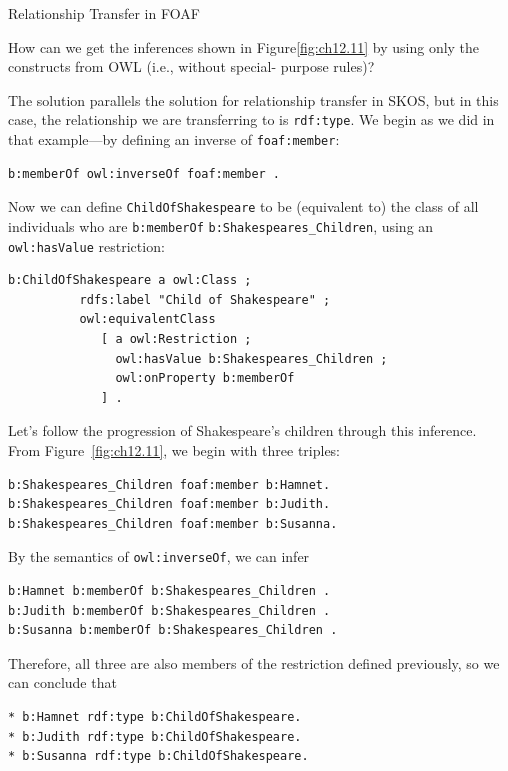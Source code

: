 \begin{challenge} {Relationship Transfer in FOAF}
\label{chal:26}

How can we get the inferences shown in Figure\ref{fig:ch12.11} by using only the
constructs from OWL (i.e., without special- purpose rules)?

\solution

The solution parallels the solution for relationship transfer in SKOS,
but in this case, the relationship we are transferring to is \texttt{rdf:type}.
We begin as we did in that example---by defining an inverse of
\texttt{foaf:member}:

\begin{lstlisting}
b:memberOf owl:inverseOf foaf:member .
\end{lstlisting}

Now we can define \texttt{ChildOfShakespeare} to be (equivalent to) the class of
all individuals who are
\texttt{b:memberOf} \texttt{b:Shakespeares\_Children}, using an \texttt{owl:hasValue} restriction:

\begin{lstlisting}
b:ChildOfShakespeare a owl:Class ;
          rdfs:label "Child of Shakespeare" ;
          owl:equivalentClass
             [ a owl:Restriction ;
               owl:hasValue b:Shakespeares_Children ;
               owl:onProperty b:memberOf
             ] .
\end{lstlisting}

Let's follow the progression of Shakespeare's children through this
inference. From Figure~\ref{fig:ch12.11}, we begin with three triples:

\begin{lstlisting}
b:Shakespeares_Children foaf:member b:Hamnet.
b:Shakespeares_Children foaf:member b:Judith.
b:Shakespeares_Children foaf:member b:Susanna.
\end{lstlisting}

By the semantics of \texttt{owl:inverseOf}, we can infer

\begin{lstlisting}
b:Hamnet b:memberOf b:Shakespeares_Children .
b:Judith b:memberOf b:Shakespeares_Children .
b:Susanna b:memberOf b:Shakespeares_Children .
\end{lstlisting}

Therefore, all three are also members of the restriction defined
previously, so we can conclude that

\begin{lstlisting}
* b:Hamnet rdf:type b:ChildOfShakespeare.
* b:Judith rdf:type b:ChildOfShakespeare.
* b:Susanna rdf:type b:ChildOfShakespeare.
\end{lstlisting}


\end{challenge}
